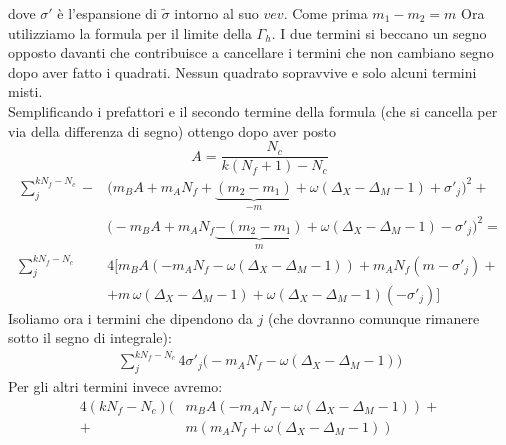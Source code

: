 \documentclass[a4paper,12pt]{article}
\begin{document}
dove $\sigma'$ è l'espansione di $\tilde{\sigma}$ intorno al suo $vev$. Come prima $m_1 - m_2 = m $
Ora utilizziamo la formula per il limite della $\Gamma_h$. I due termini si beccano un segno opposto davanti che contribuisce a cancellare i termini che non cambiano segno dopo aver fatto i quadrati. Nessun quadrato sopravvive e solo alcuni termini misti.\\
Semplificando i prefattori e il secondo termine della formula (che si cancella per via della differenza di segno) ottengo dopo aver posto 
$$
 A = \frac{N_c}{k(N_f+1) - N_c} 
$$
\begin{align*}
\sum_j^{k N_f - N_c}- &\big( m_B  A + m_A N_f + \underbrace{{(m_2 - m_1 )}}_{-m} + \omega( \Delta_X - \Delta_M - 1)  + \sigma'_j \big)^2  + \\
& \big( - m_B  A + m_A N_f \underbrace{- (m_2 - m_1 )}_{m} + \omega( \Delta_X - \Delta_M - 1) - \sigma'_j \big)^2 = \\
\sum_j^{k N_f - N_c} & 4 \big[  m_B A \left( -  m_A N_f - \omega( \Delta_X - \Delta_M - 1) \right) + m_A N_f ( m  - \sigma'_j ) +\\
&+ m \, \omega( \Delta_X - \Delta_M - 1) +  \omega( \Delta_X - \Delta_M - 1)( - \sigma'_j) \big]
\end{align*}
Isoliamo ora i termini che dipendono da $j$ (che dovranno comunque rimanere sotto il segno di integrale):
\begin{align*}
\sum_j^{k N_f - N_c} 4 \sigma'_j \big( - m_A N_f -  \omega( \Delta_X - \Delta_M - 1) \big) 
\end{align*}
Per gli altri termini invece avremo:
\begin{align*}
4 ( k N_f - N_c ) \big( & m_B A (  -  m_A N_f - \omega( \Delta_X - \Delta_M - 1)) +\\
 +  & m ( m_A N_f + \omega( \Delta_X - \Delta_M - 1)) 
\end{align*}
\end{document}
